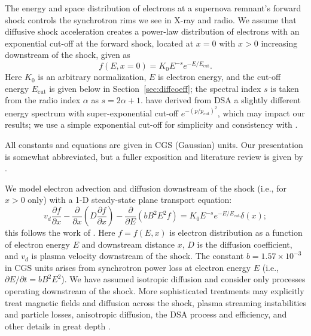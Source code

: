 \documentclass[iop, apj, numberedappendix]{emulateapj}
\newcommand*{\mt}{\mathrm}
\newcommand*{\ptl}{\partial}
\newcommand*{\Ecut}{E_{\mt{cut}}}
\begin{document}
The energy and space distribution of electrons at a supernova remnant's forward
shock controls the synchrotron rims we see in X-ray and radio.  We assume that
diffusive shock acceleration creates a power-law distribution of electrons with
an exponential cut-off at the forward shock, located at $x = 0$ with $x > 0$
increasing downstream of the shock, given as
\begin{equation}
    f(E, x=0) = K_0 E^{-s} e^{-E/\Ecut} .
\end{equation}
Here $K_0$ is an arbitrary normalization, $E$ is electron energy, and the
cut-off energy $\Ecut$ is given below in Section~\ref{sec:diffcoeff}; the
spectral index $s$ is taken from the radio index $\alpha$ as $s = 2\alpha + 1$.
\citet{zirakashvili2007} have derived from DSA a slightly different energy
spectrum with super-exponential cut-off $e^{-(p/p_{\mt{cut}})^2}$, which may
impact our results; we use a simple exponential cut-off for simplicity and
consistency with .

All constants and equations are given in CGS (Gaussian) units.  Our
presentation is somewhat abbreviated, but a fuller exposition and literature
review is given by .

We model electron advection and diffusion downstream of the shock (i.e., for
$x>0$ only) with a 1-D steady-state plane transport equation:
\begin{equation} \label{eq:model}
    v_d \frac{\ptl f}{\ptl x}
    - \frac{\ptl}{\ptl x} \left(D\frac{\ptl f}{\ptl x}\right)
    - \frac{\ptl}{\ptl E} \left(bB^2E^2f\right)
    = K_0 E^{-s} e^{-E/\Ecut} \delta(x) ;
\end{equation}
this follows the work of \citet{webb1984, berezhko2004, cassam-chenai2007,
morlino2010, rettig2012}.  Here $f = f(E,x)$ is electron distribution as a
function of electron energy $E$ and downstream distance $x$, $D$ is the
diffusion coefficient, and $v_d$ is plasma velocity downstream of the shock.
The constant $b = 1.57 \times 10^{-3}$ in CGS units arises from synchrotron
power loss at electron energy $E$ (i.e., $\ptl E/\ptl t = b B^2 E^2$).
We have assumed isotropic diffusion and consider only processes operating
downstream of the shock.  More sophisticated treatments may explicitly treat
magnetic fields and diffusion across the shock, plasma streaming instabilities
and particle losses, anisotropic diffusion, the DSA process and efficiency, and
other details in great depth \citep[e.g.,][and references therein]{reville2013,
bykov2014, ferrand2014}.
\end{document}
